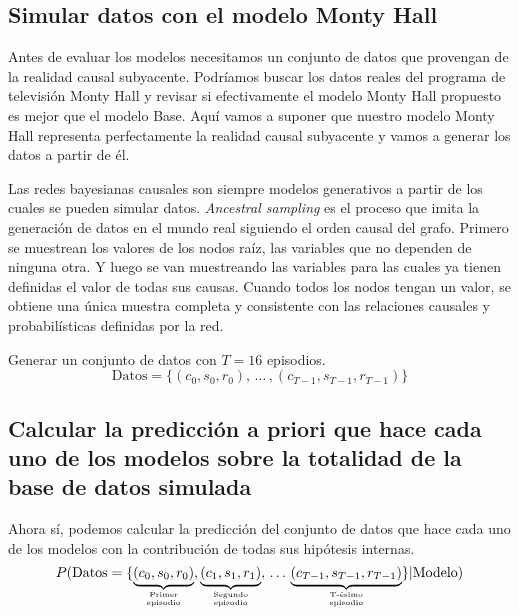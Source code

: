 \documentclass[a4paper,10pt]{article}
\begin{document}
%

\subsection{Simular datos con el modelo Monty Hall}

Antes de evaluar los modelos necesitamos un conjunto de datos que provengan de la realidad causal subyacente.
%
Podríamos buscar los datos reales del programa de televisión Monty Hall y revisar si efectivamente el modelo Monty Hall propuesto es mejor que el modelo Base.
%
Aquí vamos a suponer que nuestro modelo Monty Hall representa perfectamente la realidad causal subyacente y vamos a generar los datos a partir de él.


Las redes bayesianas causales son siempre modelos generativos a partir de los cuales se pueden simular datos.
%
\textit{Ancestral sampling} es el proceso que imita la generación de datos en el mundo real siguiendo el orden causal del grafo.
%
Primero se muestrean los valores de los nodos raíz, las variables que no dependen de ninguna otra.
%
Y luego se van muestreando las variables para las cuales ya tienen definidas el valor de todas sus causas.
%
Cuando todos los nodos tengan un valor, se obtiene una única muestra completa y consistente con las relaciones causales y probabilísticas definidas por la red.


Generar un conjunto de datos con $T=16$ episodios.
%
$$ \text{Datos} = \{(c_0, s_0, r_0), \,  \dots  \, , (c_{T-1}, s_{T-1}, r_{T-1}) \} $$

\subsection{Calcular la predicción a priori que hace cada uno de los modelos sobre la totalidad de la base de datos simulada}

Ahora sí, podemos calcular la predicción del conjunto de datos que hace cada uno de los modelos con la contribución de todas sus hipótesis internas.
%
$$P(\text{Datos} = \{\underbrace{(c_0, s_0, r_0)}_{\genfrac{}{}{0pt}{}{\text{Primer}}{\text{episodio}}}, \underbrace{(c_1, s_1, r_1)}_{\genfrac{}{}{0pt}{}{\text{Segundo}}{\text{episodio}}},  \,  \dots \, \underbrace{(c_{T-1}, s_{T-1}, r_{T-1})}_{\genfrac{}{}{0pt}{}{\text{T-ésimo}}{\text{episodio}}}  \}|\text{Modelo})$$
\end{document}
